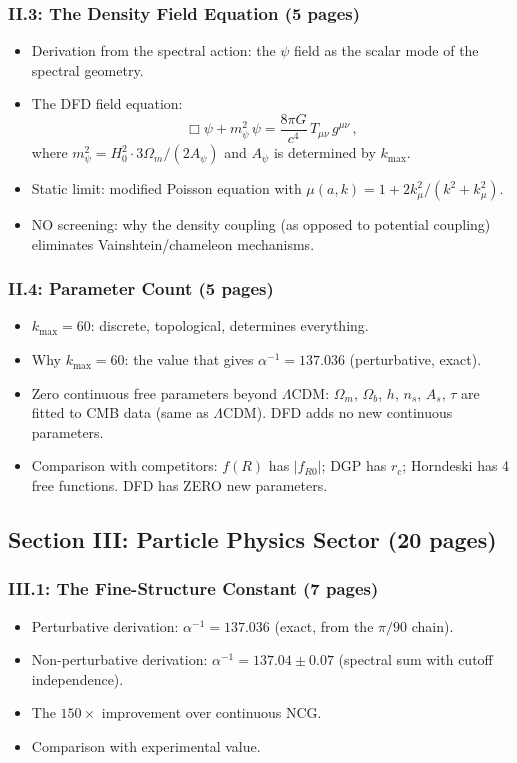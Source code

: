\documentclass[11pt,a4paper]{article}
\begin{document}
\subsubsection{II.3: The Density Field Equation (5 pages)}
\begin{itemize}
\item Derivation from the spectral action: the $\psi$ field as the scalar mode of the spectral geometry.
\item The DFD field equation:
\begin{equation}
\Box\psi + m_\psi^2\,\psi = \frac{8\pi G}{c^4}\,T_{\mu\nu}\,g^{\mu\nu}\,,
\end{equation}
where $m_\psi^2 = H_0^2 \cdot 3\Omega_m/(2A_\psi)$ and $A_\psi$ is determined by $k_{\max}$.
\item Static limit: modified Poisson equation with $\mu(a,k) = 1 + 2k_\mu^2/(k^2 + k_\mu^2)$.
\item NO screening: why the density coupling (as opposed to potential coupling) eliminates Vainshtein/chameleon mechanisms.
\end{itemize}

\subsubsection{II.4: Parameter Count (5 pages)}
\begin{itemize}
\item $k_{\max} = 60$: discrete, topological, determines everything.
\item Why $k_{\max} = 60$: the value that gives $\alpha^{-1} = 137.036$ (perturbative, exact).
\item Zero continuous free parameters beyond $\Lambda$CDM: $\Omega_m$, $\Omega_b$, $h$, $n_s$, $A_s$, $\tau$ are fitted to CMB data (same as $\Lambda$CDM). DFD adds no new continuous parameters.
\item Comparison with competitors: $f(R)$ has $|f_{R0}|$; DGP has $r_c$; Horndeski has 4 free functions. DFD has ZERO new parameters.
\end{itemize}

\subsection{Section III: Particle Physics Sector (20 pages)}

\subsubsection{III.1: The Fine-Structure Constant (7 pages)}
\begin{itemize}
\item Perturbative derivation: $\alpha^{-1} = 137.036$ (exact, from the $\pi/90$ chain).
\item Non-perturbative derivation: $\alpha^{-1} = 137.04 \pm 0.07$ (spectral sum with cutoff independence).
\item The $150\times$ improvement over continuous NCG.
\item Comparison with experimental value.
\end{itemize}
\end{document}
